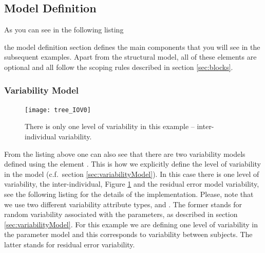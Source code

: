 \subsection{Model Definition}

As you can see in the following listing 

the model definition section defines the main components that you will see in
the subsequent examples. Apart from the structural model, all of these
elements are optional and all follow the scoping rules described in
section \ref{sec:blocks}.




\subsubsection{Variability Model}
\label{sec:eg1-variability}

\begin{figure}[ht!]
\centering
 \texttt{[image: tree\_IOV0]}
\caption{There is only one level of variability in this example -- inter-individual variability.}
\label{fig:tree_IOV0}
\end{figure}

From the listing above one can also see that there
are two variability models defined using the element
. This is how we explicitly define the
level of variability in the model (c.f.\ section
\ref{sec:variabilityModel}). In this case there is one level of 
variability, the inter-individual, Figure \ref{fig:tree_IOV0} and the residual
error model variability, see the following listing 
for the details of the implementation. Please, note that we use two different variability 
attribute types,  and . The former stands for random variability
associated with the parameters, as described in section \ref{sec:variabilityModel}. 
For this example we are defining one level of variability in the parameter model and this
corresponds to variability between subjects. The latter stands for residual error variability.

